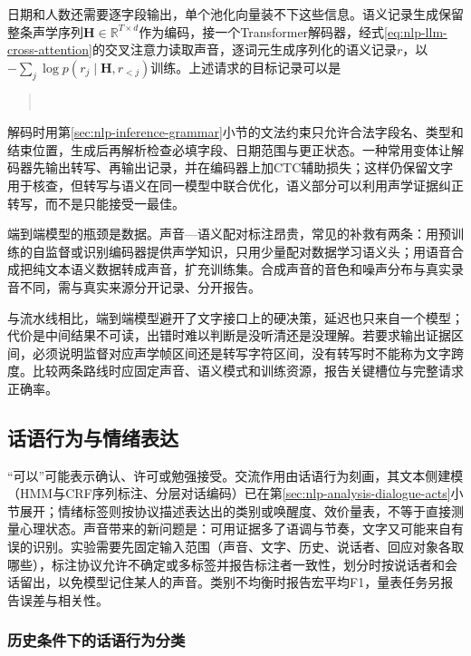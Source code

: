 日期和人数还需要逐字段输出，单个池化向量装不下这些信息。语义记录生成保留整条声学序列$\bm{H}\in\mathbb{R}^{T\times d}$作为编码，接一个Transformer解码器，经式\eqref{eq:nlp-llm-cross-attention}的交叉注意力读取声音，逐词元生成序列化的语义记录$r$，以$-\sum_j\log p(r_j\mid\bm{H},r_{<j})$训练。上述请求的目标记录可以是
\begin{quote}
\\
\end{quote}
解码时用第\ref{sec:nlp-inference-grammar}小节的文法约束只允许合法字段名、类型和结束位置，生成后再解析检查必填字段、日期范围与更正状态。一种常用变体让解码器先输出转写、再输出记录，并在编码器上加CTC辅助损失；这样仍保留文字用于核查，但转写与语义在同一模型中联合优化，语义部分可以利用声学证据纠正转写，而不是只能接受一最佳。

端到端模型的瓶颈是数据。声音—语义配对标注昂贵，常见的补救有两条：用预训练的自监督或识别编码器提供声学知识，只用少量配对数据学习语义头；用语音合成把纯文本语义数据转成声音，扩充训练集。合成声音的音色和噪声分布与真实录音不同，需与真实来源分开记录、分开报告。

与流水线相比，端到端模型避开了文字接口上的硬决策，延迟也只来自一个模型；代价是中间结果不可读，出错时难以判断是没听清还是没理解。若要求输出证据区间，必须说明监督对应声学帧区间还是转写字符区间，没有转写时不能称为文字跨度。比较两条路线时应固定声音、语义模式和训练资源，报告关键槽位与完整请求正确率。

\subsection{话语行为与情绪表达}
\label{sec:nlp-speech-pragmatics}

“可以”可能表示确认、许可或勉强接受。交流作用由话语行为刻画，其文本侧建模（HMM与CRF序列标注、分层对话编码）已在第\ref{sec:nlp-analysis-dialogue-acts}小节展开；情绪标签则按协议描述表达出的类别或唤醒度、效价量表，不等于直接测量心理状态。声音带来的新问题是：可用证据多了语调与节奏，文字又可能来自有误的识别。实验需要先固定输入范围（声音、文字、历史、说话者、回应对象各取哪些），标注协议允许不确定或多标签并报告标注者一致性，划分时按说话者和会话留出，以免模型记住某人的声音。类别不均衡时报告宏平均F1，量表任务另报告误差与相关性。

\subsubsection{历史条件下的话语行为分类}
\label{sec:nlp-speech-dialogue-act}

